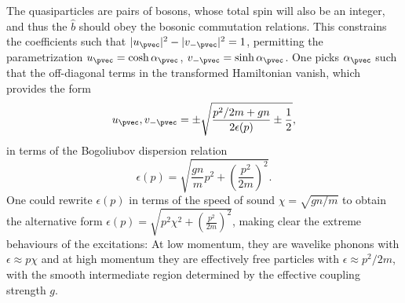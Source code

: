 {{{{{{	The quasiparticles are pairs of bosons, whose total spin will also be an integer, and thus the $\hat{b}$ should obey the bosonic commutation relations. This constrains the coefficients such that $|u_\pvec|^2-|v_{-\pvec}|^2=1$, permitting the parametrization $u_\pvec = \cosh \alpha_\pvec$, $v_{-\pvec} = \sinh \alpha_\pvec$. One picks $\alpha_\pvec$ such that the off-diagonal terms in the transformed Hamiltonian vanish, which provides the form 
	\begin{equation}
		u_\pvec,v_{-\pvec} = \pm \sqrt{\frac{p^2/2m+gn}{2\epsilon(p)} \pm \frac{1}{2}},
	\end{equation}
	in terms of the Bogoliubov dispersion relation
	\begin{equation}
		\epsilon(p) = \sqrt{\frac{gn}{m}p^2+\left(\frac{p^2}{2m}\right)^2}.
	\end{equation}
	One could rewrite $\epsilon(p)$ in terms of the speed of sound $\chi=\sqrt{gn/m}$ to obtain the alternative form $\epsilon(p) = \sqrt{p^2\chi^2+\left(\frac{p^2}{2m}\right)^2}$, making clear the extreme behaviours of the excitations: At low momentum, they are wavelike phonons with $\epsilon\approx p\chi$ and at high momentum they are effectively free particles with $\epsilon\approx p^2/2m$, with the smooth intermediate region determined by the effective coupling strength $g$.

}}}}}}

